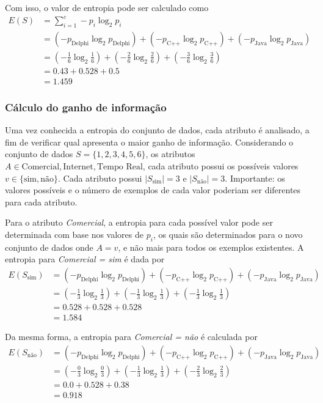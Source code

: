 Com isso, o valor de entropia pode ser calculado como
\begin{align*}
	E(S) &= \sum_{i=1}^{c} -p_i \log_2 p_i \\[10pt]
	&= (-p_{\text{Delphi}} \log_2 p_{\text{Delphi}}) + (-p_{\text{C++}} \log_2 p_{\text{C++}}) + (-p_{\text{Java}} \log_2 p_{\text{Java}}) \\[10pt]
	&= \left( -\frac{1}{6} \log_2 \frac{1}{6} \right) + \left( -\frac{2}{6} \log_2 \frac{2}{6} \right) + \left( -\frac{3}{6} \log_2 \frac{3}{6} \right) \\[10pt]
	&= 0.43 + 0.528 + 0.5\\[10pt]
	&= 1.459
\end{align*}

\subsubsection{Cálculo do ganho de informação}

Uma vez conhecida a entropia do conjunto de dados, cada atributo é analisado, a fim de verificar qual apresenta o maior ganho de informação. Considerando o conjunto de dados $S = \{1, 2, 3, 4, 5, 6\}$, os atributos $A \in {\text{Comercial}, \text{Internet}, \text{Tempo Real}}$, cada atributo possui os possíveis valores $v \in \{\text{sim}, \text{não}\}$. Cada atributo possui $|S_\text{sim}| = 3$ e $|S_\text{não}| = 3$. Importante: os valores possíveis e o número de exemplos de cada valor poderiam ser diferentes para cada atributo.

Para o atributo \textit{Comercial}, a entropia para cada possível valor pode ser determinada com base nos valores de $p_i$, os quais são determinados para o novo conjunto de dados onde $A = v$, e não mais para todos os exemplos existentes. A entropia para \textit{Comercial = sim} é dada por
\begin{align*}
	E(S_\text{sim}) &= (-p_\text{Delphi} \log_2 p_\text{Delphi}) + (-p_\text{C++} \log_2 p_\text{C++}) + (-p_\text{Java} \log_2 p_\text{Java})\\[10pt]
	&= \left( - \frac{1}{3} \log_2 \frac{1}{3} \right) + \left( - \frac{1}{3} \log_2 \frac{1}{3} \right) + \left( - \frac{1}{3} \log_2 \frac{1}{3} \right)\\[10pt]
	&= 0.528 + 0.528 + 0.528\\[10pt]
	&= 1.584
\end{align*}

Da mesma forma, a entropia para \textit{Comercial = não} é calculada por 
\begin{align*}
	E(S_\text{não}) &= (-p_\text{Delphi} \log_2 p_\text{Delphi}) + (-p_\text{C++} \log_2 p_\text{C++}) + (-p_\text{Java} \log_2 p_\text{Java})\\[10pt]
	&= \left( - \frac{0}{3} \log_2 \frac{0}{3} \right) + \left( - \frac{1}{3} \log_2 \frac{1}{3} \right) + \left( - \frac{2}{3} \log_2 \frac{2}{3} \right)\\[10pt]
	&= 0.0 + 0.528 + 0.38\\[10pt]
	&= 0.918
\end{align*}

